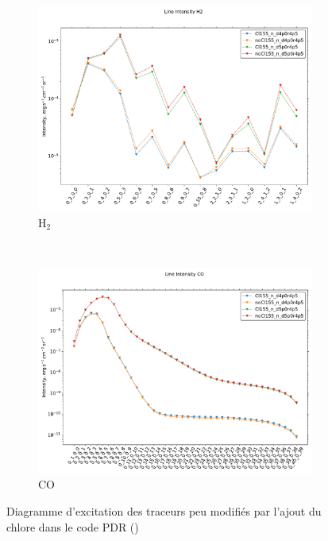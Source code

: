 \begin{figure}[!htbp]
    \begin{subfigure}[t]{0.45\textwidth} %
        \centering \includegraphics[trim = {0 0 0 1.5cm},clip,width=1\textwidth]{figure/Cl/gridModelEmiss/I_comp_H2.pdf}
        \caption{$\mathrm{H}_2$}
    \end{subfigure}
    ~ 
    \begin{subfigure}[t]{0.45\textwidth} %
        \centering \includegraphics[trim = {0 0 0 1.5cm},clip,width=1\textwidth]{figure/Cl/gridModelEmiss/I_comp_CO.pdf}
        \caption{$\mathrm{CO}$}
    \end{subfigure}
    
    \caption{Diagramme d'excitation des traceurs peu modifiés par l'ajout du chlore dans le code PDR (\uncinq)}
    \label{fig:Cl:gridModelEmiss:no}
\end{figure}


